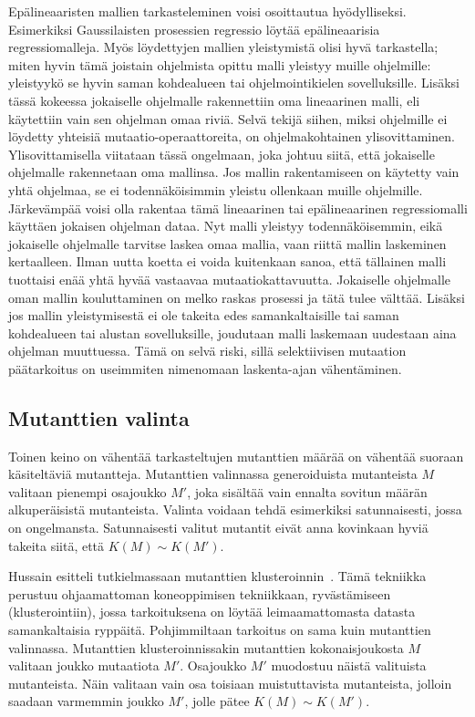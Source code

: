 \documentclass[finnish]{tktltiki2}
\begin{document}
Epälineaaristen mallien tarkasteleminen voisi osoittautua hyödylliseksi. Esimerkiksi Gaussilaisten prosessien regressio löytää epälineaarisia regressiomalleja. Myös löydettyjen mallien yleistymistä olisi hyvä tarkastella; miten hyvin tämä joistain ohjelmista opittu malli yleistyy muille ohjelmille: yleistyykö se hyvin saman kohdealueen tai ohjelmointikielen sovelluksille. Lisäksi tässä kokeessa jokaiselle ohjelmalle rakennettiin oma lineaarinen malli, eli käytettiin vain sen ohjelman omaa riviä. Selvä tekijä siihen, miksi ohjelmille ei löydetty yhteisiä mutaatio-operaattoreita, on ohjelmakohtainen ylisovittaminen. Ylisovittamisella viitataan tässä ongelmaan, joka johtuu siitä, että jokaiselle ohjelmalle rakennetaan oma mallinsa. Jos mallin rakentamiseen on käytetty vain yhtä ohjelmaa, se ei todennäköisimmin yleistu ollenkaan muille ohjelmille. Järkevämpää voisi olla rakentaa tämä lineaarinen tai epälineaarinen regressiomalli käyttäen jokaisen ohjelman dataa. Nyt malli yleistyy todennäköisemmin, eikä jokaiselle ohjelmalle tarvitse laskea omaa mallia, vaan riittä mallin laskeminen kertaalleen. Ilman uutta koetta ei voida kuitenkaan sanoa, että tällainen malli tuottaisi enää yhtä hyvää vastaavaa mutaatiokattavuutta. Jokaiselle ohjelmalle oman mallin kouluttaminen on melko raskas prosessi ja tätä tulee välttää. Lisäksi jos mallin yleistymisestä ei ole takeita edes samankaltaisille tai saman kohdealueen tai alustan sovelluksille, joudutaan malli laskemaan uudestaan aina ohjelman muuttuessa. Tämä on selvä riski, sillä selektiivisen mutaation päätarkoitus on useimmiten nimenomaan laskenta-ajan vähentäminen.

\subsection{Mutanttien valinta}
Toinen keino on vähentää tarkasteltujen mutanttien määrää on vähentää suoraan käsiteltäviä mutantteja. Mutanttien valinnassa generoiduista mutanteista $M$ valitaan pienempi osajoukko $M'$, joka sisältää vain ennalta sovitun määrän alkuperäisistä mutanteista. Valinta voidaan tehdä esimerkiksi satunnaisesti, jossa on ongelmansta. Satunnaisesti valitut mutantit eivät anna kovinkaan hyviä takeita siitä, että $K(M) \sim K(M')$. 

Hussain esitteli tutkielmassaan mutanttien klusteroinnin~\cite{Hussain08}. Tämä tekniikka perustuu ohjaamattoman koneoppimisen tekniikkaan, ryvästämiseen (klusterointiin), jossa tarkoituksena on löytää leimaamattomasta datasta samankaltaisia ryppäitä. Pohjimmiltaan tarkoitus on sama kuin mutanttien valinnassa. Mutanttien klusteroinnissakin mutanttien kokonaisjoukosta $M$ valitaan joukko mutaatiota $M'$. Osajoukko $M'$ muodostuu näistä valituista mutanteista. Näin valitaan vain osa toisiaan muistuttavista mutanteista, jolloin saadaan varmemmin joukko $M'$, jolle pätee $K(M) \sim K(M')$. 
\end{document}

